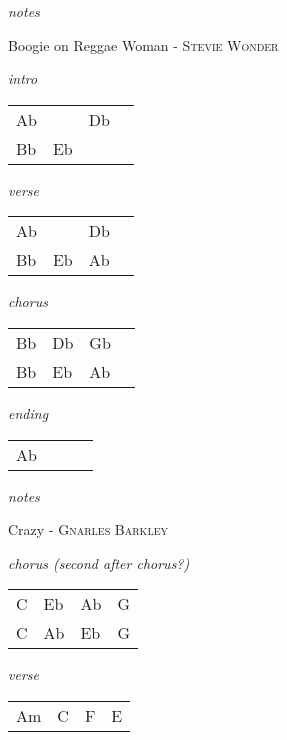\documentclass[12pt]{article}
\begin{document}
\textit{notes}

\newpage

{\Huge Boogie on Reggae Woman} {\huge - \textsc{Stevie Wonder}}

\huge
\textit{intro}

\begin{tabular}{|P{1.25in}|P{1.25in}|P{1.25in}|P{1.25in}|}
  Ab &     & Db  &   \\
  Bb & Eb  &
\end{tabular}

\textit{verse}

\begin{tabular}{|P{1.25in}|P{1.25in}|P{1.25in}|P{1.25in}|}
  Ab &   &  Db &   \\
  Bb  & Eb  & Ab &  \\
\end{tabular}

\textit{chorus}

\begin{tabular}{|P{1.25in}|P{1.25in}|P{1.25in}|P{1.25in}|}
  Bb & Db  & Gb  &   \\
  Bb & Eb  & Ab  &   \\
\end{tabular}

\textit{ending}

\begin{tabular}{|P{1.25in}|P{1.25in}|P{1.25in}|P{1.25in}|}
  Ab &   &   &   \\
\end{tabular}

\textit{notes}

\newpage

{\Huge Crazy} {\huge - \textsc{Gnarles Barkley}}

\huge
\textit{chorus (second after chorus?)}

\begin{tabular}{|P{1.25in}|P{1.25in}|P{1.25in}|P{1.25in}|}
  C  & Eb  & Ab   & G   \\
  C  &  Ab  &  Eb  & G \\
\end{tabular}

\textit{verse}

\begin{tabular}{|P{1.25in}|P{1.25in}|P{1.25in}|P{1.25in}|}
   Am &  C & F  &  E \\
\end{tabular}
\end{document}
